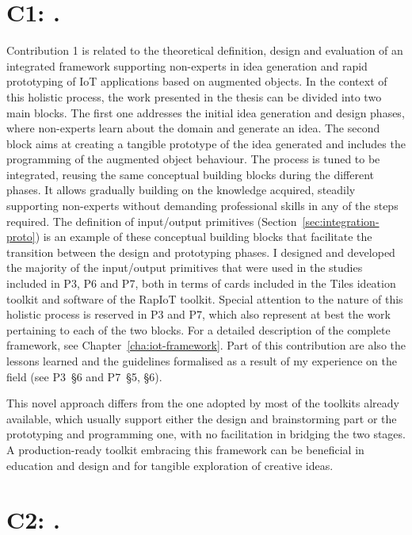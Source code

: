 \section[C1: \Ci][Contribution 1]{C1: \Ci.}
\label{c1}

Contribution 1 is related to the theoretical definition, design and evaluation of an integrated framework supporting non-experts in idea generation and rapid prototyping of IoT applications based on augmented objects. In the context of this holistic process, the work presented in the thesis can be divided into two main blocks. The first one addresses the initial idea generation and design phases, where non-experts learn about the domain and generate an idea. The second block aims at creating a tangible prototype of the idea generated and includes the programming of the augmented object behaviour.
The process is tuned to be integrated, reusing the same conceptual building blocks during the different phases. It allows gradually building on the knowledge acquired, steadily supporting non-experts without demanding professional skills in any of the steps required. The definition of input/output primitives (Section~\ref{sec:integration-proto}) is an example of these conceptual building blocks that facilitate the transition between the design and prototyping phases. I designed and developed the majority of the input/output primitives that were used in the studies included in P3, P6 and P7, both in terms of cards included in the Tiles ideation toolkit and software of the RapIoT toolkit.
Special attention to the nature of this holistic process is reserved in P3 and P7, which also represent at best the work pertaining to each of the two blocks. For a detailed description of the complete framework, see Chapter~\ref{cha:iot-framework}.
Part of this contribution are also the lessons learned and the guidelines formalised as a result of my experience on the field (see P3~\S6 and P7~\S5, \S6).

This novel approach differs from the one adopted by most of the toolkits already available, which usually support either the design and brainstorming part or the prototyping and programming one, with no facilitation in bridging the two stages. A production-ready toolkit embracing this framework can be beneficial in education and design and for tangible exploration of creative ideas.


\section[C2: \Cii][Contribution 2]{C2: \Cii.}
\label{c2}

